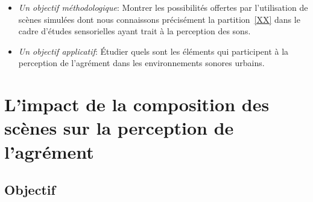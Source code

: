\begin{itemize}
\item \emph{Un objectif méthodologique}: Montrer les possibilités offertes par l'utilisation de scènes simulées  dont nous connaissons précisément la partition~\ref{XX} dans le cadre d'études sensorielles ayant trait à la perception des sons.
\item \emph{Un objectif applicatif}: Étudier quels sont les éléments qui participent à la perception de l'agrément dans les environnements sonores urbains. 
\end{itemize}

\section{L'impact de la composition des scènes sur la perception de l'agrément}
\label{sec:xp1_2}

\subsection{Objectif}

